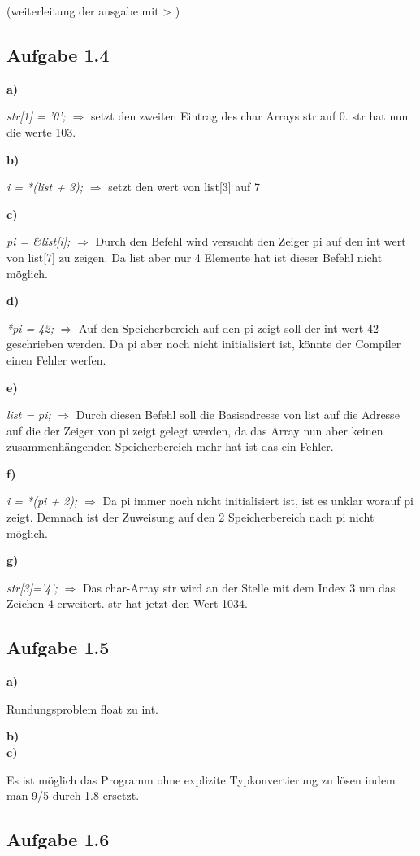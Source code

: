 \documentclass[a4paper,graphics,11pt]{article}
\newcommand{\aufgabe}[1]{\subsection*{Aufgabe #1}}
\begin{document}
(weiterleitung der ausgabe mit > )

\aufgabe{1.4}

\textbf{a)}

\textit{str[1] = ’0’;} $\Longrightarrow$ setzt den zweiten Eintrag des char Arrays str auf 0. str hat nun die werte 103.

\textbf{b)}

\textit{i = *(list + 3);} $\Longrightarrow$ setzt den wert von list[3] auf 7

\textbf{c)}

\textit{pi =  \&list[i];} $\Longrightarrow$ Durch den Befehl wird versucht den Zeiger pi auf den int wert von list[7] zu zeigen. Da list aber nur 4 Elemente hat ist dieser Befehl nicht möglich.

\textbf{d)}

\textit{*pi = 42;} $\Longrightarrow$ Auf den Speicherbereich auf den pi zeigt soll der int wert 42 geschrieben werden. Da pi aber noch nicht initialisiert ist, könnte der Compiler einen Fehler werfen.

\textbf{e)}

\textit{list = pi;} $\Longrightarrow$ Durch diesen Befehl soll die Basisadresse von list auf die Adresse auf die der Zeiger von pi zeigt gelegt werden, da das Array nun aber keinen zusammenhängenden Speicherbereich mehr hat ist das ein Fehler.

\textbf{f)}

\textit{i = *(pi + 2);} $\Longrightarrow$ Da pi immer noch nicht initialisiert ist, ist es unklar worauf pi zeigt. Demnach ist der Zuweisung auf den 2 Speicherbereich nach pi nicht möglich.

\textbf{g)}

\textit{str[3]=’4’;} $\Longrightarrow$ Das char-Array str wird an der Stelle mit dem Index 3 um das Zeichen 4 erweitert. str hat jetzt den Wert 1034.

\newpage

\aufgabe{1.5}

\textbf{a)}

Rundungsproblem float zu int.

\textbf{b)}\\



\textbf{c)}

Es ist möglich das Programm ohne explizite Typkonvertierung zu lösen indem man 9/5 durch 1.8 ersetzt.

\aufgabe{1.6}
\end{document}
